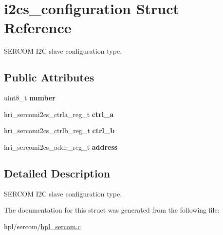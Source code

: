 \hypertarget{structi2cs__configuration}{}\section{i2cs\+\_\+configuration Struct Reference}
\label{structi2cs__configuration}


S\+E\+R\+C\+OM I2C slave configuration type.  


\subsection*{Public Attributes}
\begin{DoxyCompactItemize}
\item 
\mbox{\label{structi2cs__configuration_ad34e886793b5cc44b6d63dd9da42cc74}} 
uint8\+\_\+t {\bfseries number}
\item 
\mbox{\label{structi2cs__configuration_ad5a6104004cad3a62a62a4df5e871213}} 
hri\+\_\+sercomi2cs\+\_\+ctrla\+\_\+reg\+\_\+t {\bfseries ctrl\+\_\+a}
\item 
\mbox{\label{structi2cs__configuration_ac7b348e82f0123e97bd26787af2f0a93}} 
hri\+\_\+sercomi2cs\+\_\+ctrlb\+\_\+reg\+\_\+t {\bfseries ctrl\+\_\+b}
\item 
\mbox{\label{structi2cs__configuration_acb026e4c04cc24bd9fcf5cbb3cc881d0}} 
hri\+\_\+sercomi2cs\+\_\+addr\+\_\+reg\+\_\+t {\bfseries address}
\end{DoxyCompactItemize}


\subsection{Detailed Description}
S\+E\+R\+C\+OM I2C slave configuration type. 

The documentation for this struct was generated from the following file\+:\begin{DoxyCompactItemize}
\item 
hpl/sercom/\hyperlink{hpl__sercom_8c}{hpl\+\_\+sercom.\+c}\end{DoxyCompactItemize}
